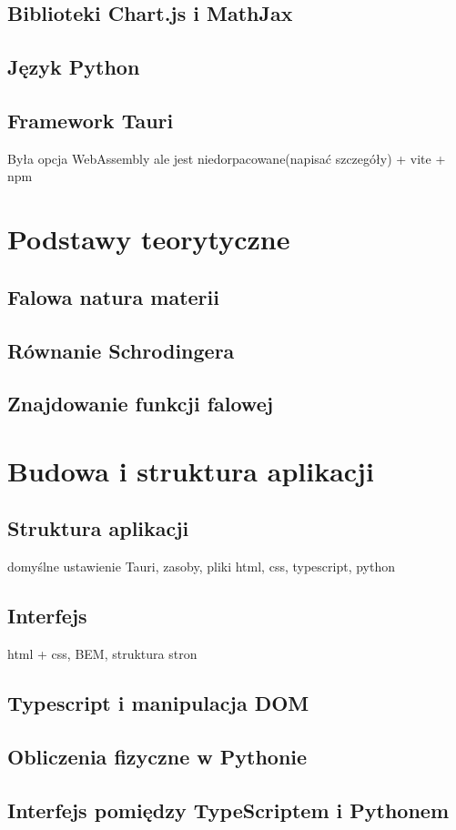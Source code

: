 \documentclass{SGGW-thesis}
\begin{document}
	\section{Biblioteki Chart.js i MathJax}
	\section{Język Python}
	\section{Framework Tauri}
	Była opcja WebAssembly ale jest niedorpacowane(napisać szczegóły)
	+ vite + npm
	
\chapter{Podstawy teorytyczne}
	\section{Falowa natura materii}
	\section{Równanie Schrodingera}
	\section{Znajdowanie funkcji falowej}
	
\chapter{Budowa i struktura aplikacji}
	\section{Struktura aplikacji}
	domyślne ustawienie Tauri, zasoby, pliki html, css, typescript, python
	\section{Interfejs}
	html + css, BEM, struktura stron
	\section{Typescript i manipulacja DOM}
	\section{Obliczenia fizyczne w Pythonie}
	\section{Interfejs pomiędzy TypeScriptem i Pythonem}
\end{document}
